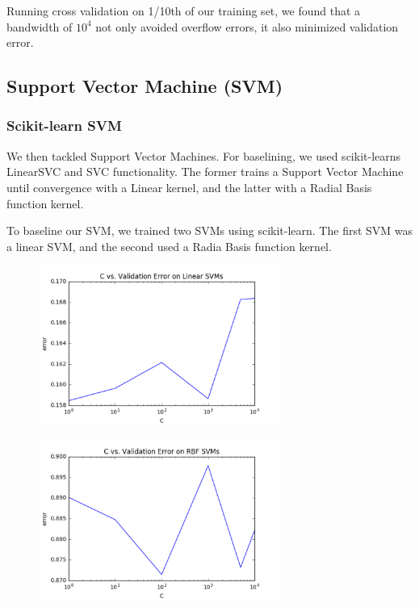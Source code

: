 ﻿\documentclass{article} %
\begin{document}
Running cross validation on 1/10th of our training set, we found that a
bandwidth of $10^4$ not only avoided overflow errors, it also minimized validation error.

\subsection{Support Vector Machine (SVM)}
\subsubsection{Scikit-learn SVM}
We then tackled Support Vector Machines. For baselining,
we used scikit-learns LinearSVC and SVC functionality. The
former trains a Support Vector Machine until convergence with
a Linear kernel, and the latter with a Radial Basis function kernel. 

To baseline our SVM, we trained two SVMs using scikit-learn. The first SVM was a
linear SVM, and the second used a Radia Basis function kernel.

\begin{figure}[h]
\centering
\includegraphics[width=0.7\textwidth]{sklearn-svm-c-cv.png}
\end{figure}

\begin{figure}[h]
\centering
\includegraphics[width=0.7\textwidth]{sklearn-svm-kernel-c-cv.png}
\end{figure}
\end{document}
